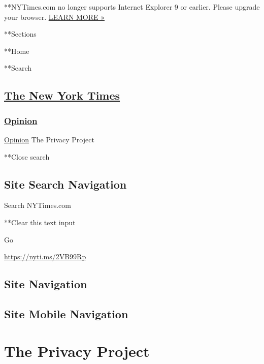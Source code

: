  **NYTimes.com no longer supports Internet Explorer 9 or earlier. Please
upgrade your browser.
\href{http://www.nytimes.com/content/help/site/ie9-support.html}{LEARN
MORE »}

**Sections

**Home

**Search

\hypertarget{the-new-york-times}{%
\subsection{\texorpdfstring{\href{http://www.nytimes.com/}{The New York
Times}}{The New York Times}}\label{the-new-york-times}}

\hypertarget{-opinion-}{%
\subsubsection{\texorpdfstring{ \href{/section/opinion}{Opinion}
}{ Opinion }}\label{-opinion-}}

 \href{/section/opinion}{Opinion} \textbar{}The Privacy Project

**Close search

\hypertarget{site-search-navigation}{%
\subsection{Site Search Navigation}\label{site-search-navigation}}

Search NYTimes.com

**Clear this text input

Go

\url{https://nyti.ms/2VB99Rp}

\hypertarget{site-navigation}{%
\subsection{Site Navigation}\label{site-navigation}}

\hypertarget{site-mobile-navigation}{%
\subsection{Site Mobile Navigation}\label{site-mobile-navigation}}

\hypertarget{the-privacy-project}{%
\section{The Privacy Project}\label{the-privacy-project}}

